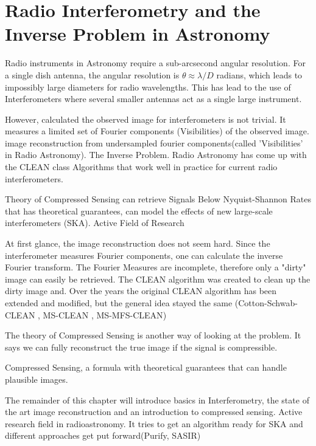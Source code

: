 \section{Radio Interferometry and the Inverse Problem in Astronomy}\label{intro}
Radio instruments in Astronomy require a sub-arcsecond angular resolution. For a single dish antenna, the angular resolution is $ \theta \approx \lambda / D$ radians, which leads to impossibly large diameters for radio wavelengths. This has lead to the use of Interferometers where several smaller antennas act as a single large instrument. 

However, calculated the observed image for interferometers is not trivial. It measures a limited set of Fourier components (Visibilities) of the observed image. image reconstruction from undersampled fourier components(called 'Visibilities' in Radio Astronomy). The Inverse Problem. Radio Astronomy has come up with the CLEAN class Algorithms\cite{hogbom1974aperture} \cite{schwab1984relaxing} \cite{rich2008multi}\cite{rau2011multi} that work well in practice for current radio interferometers.

Theory of Compressed Sensing can retrieve Signals Below Nyquist-Shannon Rates that has theoretical guarantees, can model the effects of new large-scale interferometers (SKA). Active Field of Research





At first glance, the image reconstruction does not seem hard. Since the interferometer measures Fourier components, one can calculate the inverse Fourier transform. The Fourier Measures are incomplete, therefore only a "dirty" image can easily be retrieved. The CLEAN \cite{hogbom1974aperture} algorithm was created to clean up the dirty image and. Over the years the original CLEAN algorithm has been extended and modified, but the general idea stayed the same (Cotton-Schwab-CLEAN \cite{schwab1984relaxing}, MS-CLEAN \cite{rich2008multi}, MS-MFS-CLEAN\cite{rau2011multi})

The theory of Compressed Sensing \cite{candes2006robust} \cite{donoho2006compressed} is another way of looking at the problem. It says we can fully reconstruct the true image if the signal is compressible.

Compressed Sensing, a formula with theoretical guarantees that can handle plausible images.

The remainder of this chapter will introduce basics in Interferometry, the state of the art image reconstruction and an introduction to compressed sensing. Active research field in radioastronomy. It tries to get an algorithm ready for SKA and different approaches get put forward(Purify, SASIR)

